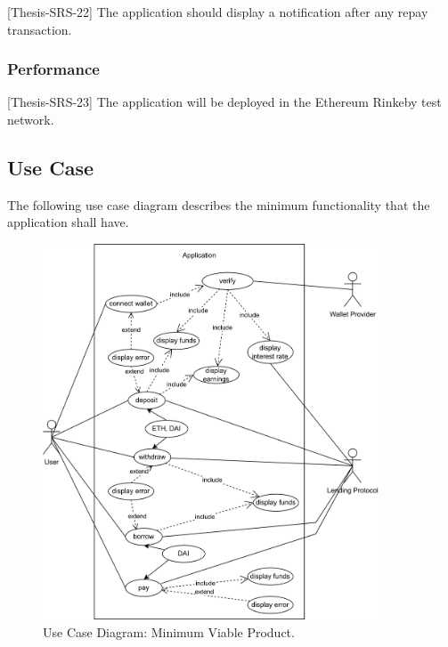 \documentclass[11pt,a4paper]{report}
\begin{document}
[Thesis-SRS-22] The application should display a notification after any repay transaction.
\subsubsection{Performance}
[Thesis-SRS-23] The application will be deployed in the Ethereum Rinkeby test network.
\subsection{Use Case}
The following use case diagram describes the minimum functionality that the application shall have.
\begin{figure}[htp]
	\centering
	\includegraphics[width=0.89\textwidth]{./images/USECASE-full_nofl}
	\caption{Use Case Diagram: Minimum Viable Product.}
	\label{fig:usecase-mvp}
\end{figure}
\newpage
\end{document}
